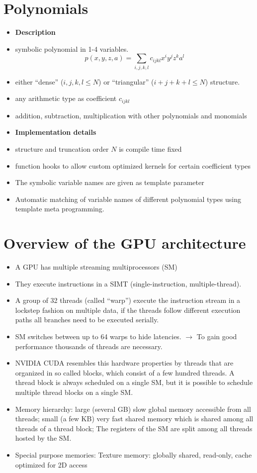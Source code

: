 \documentclass[oribibl]{llncs2e/llncs}
\begin{document}
\section{Polynomials}
\begin{itemize}
\item {\bf Description}
\item symbolic polynomial in 1-4 variables.
\begin{equation}
    p(x,y,z,a) = \sum_{i,j,k,l} c_{ijkl} x^i y^j z^k a^l
\end{equation}
\item either ``dense'' (${i,j,k,l} \le N$) or ``triangular'' ($i+j+k+l \le N$) structure.
\item any arithmetic type as coefficient $c_{ijkl}$
\item addition, subtraction, multiplication with other polynomials and monomials
\item {\bf Implementation details}
\item structure and truncation order $N$ is compile time fixed 
\item function hooks to allow custom optimized kernels for certain coefficient types
\item The symbolic variable names are given as template parameter
\item Automatic matching of variable names of different polynomial types using template meta programming.
\end{itemize}

\section{Overview of the GPU architecture}
\begin{itemize}
\item A GPU has multiple streaming multiprocessors (SM)
\item They execute instructions in a SIMT (single-instruction, multiple-thread).
\item A group of 32 threads (called ``warp'') execute the instruction stream in a lockstep fashion on multiple data, if the threads follow different execution paths all branches need to be executed serially.
\item SM switches between up to 64 warps to hide latencies. $\rightarrow$ To gain good performance thousands of threads are necessary.
\item NVIDIA CUDA resembles this hardware properties by threads that are organized in so called blocks, which consist of a few hundred threads. A thread block is always scheduled on a single SM, but it is possible to schedule multiple thread blocks on a single SM.
\item Memory hierarchy: large (several GB) slow global memory accessible from all threads; small (a few KB) very fast shared memory which is shared among all threads of a thread block; The registers of the SM are split among all threads hosted by the SM.
\item Special purpose memories: Texture memory: globally shared, read-only, cache optimized for 2D access
\end{itemize}
\end{document}
